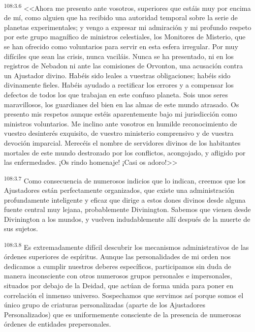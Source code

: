 \par
\textsuperscript{108:3.6} <<Ahora me presento ante vosotros, superiores que estáis muy por encima de mí, como alguien que ha recibido una autoridad temporal sobre la serie de planetas experimentales; y vengo a expresar mi admiración y mi profundo respeto por este grupo magnífico de ministros celestiales, los Monitores de Misterio, que se han ofrecido como voluntarios para servir en esta esfera irregular. Por muy difíciles que sean las crisis, nunca vaciláis. Nunca se ha presentado, ni en los registros de Nebadon ni ante las comisiones de Orvonton, una acusación contra un Ajustador divino. Habéis sido leales a vuestras obligaciones; habéis sido divinamente fieles. Habéis ayudado a rectificar los errores y a compensar los defectos de todos los que trabajan en este confuso planeta. Sois unos seres maravillosos, los guardianes del bien en las almas de este mundo atrasado. Os presento mis respetos aunque estéis aparentemente bajo mi jurisdicción como ministros voluntarios. Me inclino ante vosotros en humilde reconocimiento de vuestro desinterés exquisito, de vuestro ministerio comprensivo y de vuestra devoción imparcial. Merecéis el nombre de servidores divinos de los habitantes mortales de este mundo destrozado por los conflictos, acongojado, y afligido por las enfermedades. ¡Os rindo homenaje! ¡Casi os adoro!>>

\par
\textsuperscript{108:3.7} Como consecuencia de numerosos indicios que lo indican, creemos que los Ajustadores están perfectamente organizados, que existe una administración profundamente inteligente y eficaz que dirige a estos dones divinos desde alguna fuente central muy lejana, probablemente Divinington. Sabemos que vienen desde Divinington a los mundos, y vuelven indudablemente allí después de la muerte de sus sujetos.

\par
\textsuperscript{108:3.8} Es extremadamente difícil descubrir los mecanismos administrativos de las órdenes superiores de espíritus. Aunque las personalidades de mi orden nos dedicamos a cumplir nuestros deberes específicos, participamos sin duda de manera inconsciente con otros numerosos grupos personales e impersonales, situados por debajo de la Deidad, que actúan de forma unida para poner en correlación el inmenso universo. Sospechamos que servimos así porque somos el único grupo de criaturas personalizadas (aparte de los Ajustadores Personalizados) que es uniformemente consciente de la presencia de numerosas órdenes de entidades prepersonales.


